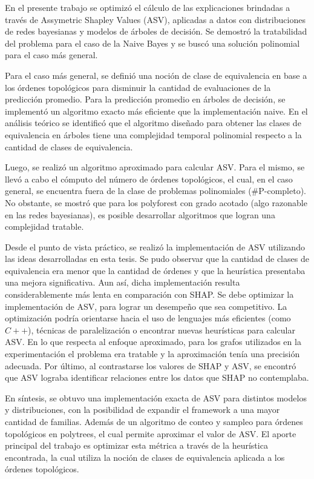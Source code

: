 En el presente trabajo se optimizó el cálculo de las explicaciones brindadas a través de Assymetric Shapley Values (ASV), aplicadas a datos con distribuciones de redes bayesianas y modelos de árboles de decisión. Se demostró la tratabilidad del problema para el caso de la Naive Bayes y se buscó una solución polinomial para el caso más general. 

Para el caso más general, se definió una noción de clase de equivalencia en base a los órdenes topológicos para disminuir la cantidad de evaluaciones de la predicción promedio. Para la predicción promedio en árboles de decisión, se implementó un algoritmo exacto más eficiente que la implementación naive. En el análisis teórico se identificó que el algoritmo diseñado para obtener las clases de equivalencia en árboles tiene una complejidad temporal polinomial respecto a la cantidad de clases de equivalencia. 

Luego, se realizó un algoritmo aproximado para calcular ASV. Para el mismo, se llevó a cabo el cómputo del número de órdenes topológicos, el cual, en el caso general, se encuentra fuera de la clase de problemas polinomiales (\#P-completo). No obstante, se mostró que para los polyforest con grado acotado (algo razonable en las redes bayesianas), es posible desarrollar algoritmos que logran una complejidad tratable. 

Desde el punto de vista práctico, se realizó la implementación de ASV utilizando las ideas desarrolladas en esta tesis. Se pudo observar que la cantidad de clases de equivalencia era  menor que la cantidad de órdenes y que la heurística presentaba una mejora significativa. Aun así, dicha implementación resulta considerablemente más lenta en comparación con SHAP. Se debe optimizar la implementación de ASV, para lograr un desempeño que sea competitivo. La optimización podría orientarse hacia el uso de lenguajes más eficientes (como $C++$), técnicas de paralelización o encontrar nuevas heurísticas para calcular ASV. En lo que respecta al enfoque aproximado, para los grafos utilizados en la experimentación el problema era tratable y la aproximación tenía una precisión adecuada. Por último, al contrastarse los valores de SHAP y ASV, se encontró que ASV lograba identificar relaciones entre los datos que SHAP no contemplaba. 

En síntesis, se obtuvo una implementación exacta de ASV para distintos modelos y distribuciones, con la posibilidad de expandir el framework a una mayor cantidad de familias. Además de un algoritmo de conteo y sampleo para órdenes topológicos en polytrees, el cual permite aproximar el valor de ASV. El aporte principal del trabajo es optimizar esta métrica a través de la heurística encontrada, la cual utiliza la noción de clases de equivalencia aplicada a los órdenes topológicos. 


